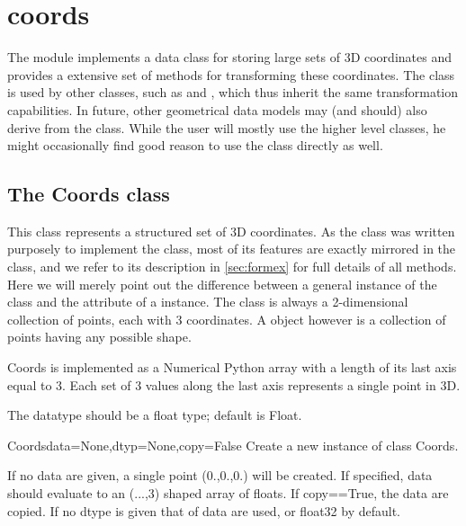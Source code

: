 
\section{coords}
\label{sec:coords}

The  module implements a data class for storing large sets of 3D coordinates and provides a extensive set of methods for transforming these coordinates. The  class is used by other classes, such as  and , which thus inherit the same transformation capabilities. In future, other geometrical data models may (and should) also derive from the  class. While the user will mostly use the higher level classes, he might occasionally find good reason to use the  class directly as well.

\subsection{The Coords class}
This class represents a structured set of 3D coordinates.
As the  class was written purposely to implement the  class, most of its features are exactly mirrored in the  class, and we refer to its description in \ref{sec:formex} for full details of all methods. Here we will merely point out the difference between a general instance of the  class and the  attribute of a  instance. 
The  class is always a 2-dimensional collection of  points, each with 3 coordinates. A  object however is a collection of points having any possible shape.

Coords is implemented as a Numerical Python array with a length of its
last axis equal to 3.
Each set of 3 values along the last axis represents a single point in 3D.

The datatype should be a float type; default is Float.

\begin{classdesc}{Coords}{data=None,dtyp=None,copy=False}
Create a new instance of class Coords.

If no data are given, a single point (0.,0.,0.) will be created.
If specified, data should evaluate to an (...,3) shaped array of floats.
If copy==True, the data are copied.
If no dtype is given that of data are used, or float32 by default.

\end{classdesc}


